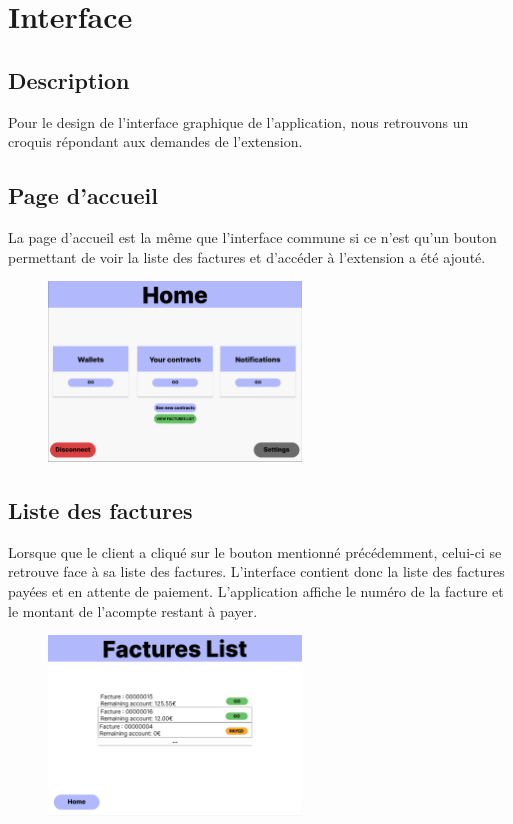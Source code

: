 \section{Interface}
\subsection{Description}

\begin{flushleft}
Pour le design de l'interface graphique de l'application, nous retrouvons un croquis répondant aux demandes de l'extension.
\end{flushleft}

\subsection{Page d'accueil}
\begin{flushleft}
La page d'accueil est la même que l'interface commune si ce n'est qu'un bouton permettant de voir la liste des factures et d'accéder à l'extension a été ajouté.
\end{flushleft}
\begin{figure}[h]
\centering
\includegraphics[width = 0.6\textwidth]{extension-maxime/interface/img/home.png}
\end{figure}

\newpage
\subsection{Liste des factures}
\begin{flushleft}
Lorsque que le client a cliqué sur le bouton mentionné précédemment, celui-ci se retrouve face à sa liste des factures. L'interface contient donc la liste des factures payées et en attente de paiement. L'application affiche le numéro de la facture et le montant de l'acompte restant à payer.
\end{flushleft}
\begin{figure}[h]
\centering
\includegraphics[width = 0.6\textwidth]{extension-maxime/interface/img/list.png}
\end{figure}

